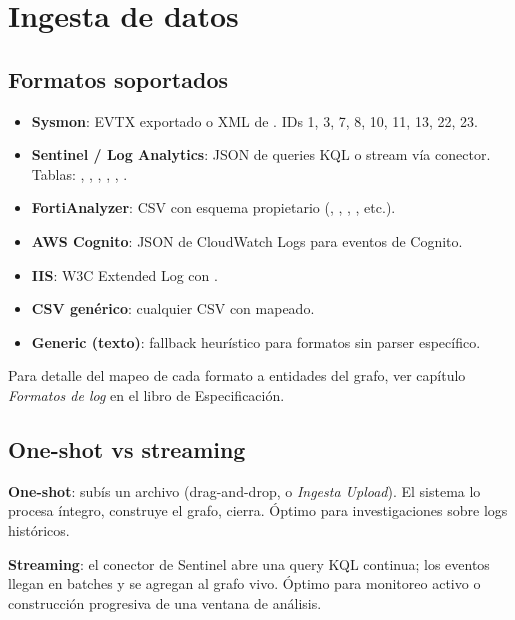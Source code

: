 \chapter{Ingesta de datos}
\label{sec:man-ingesta}

\section{Formatos soportados}

\begin{itemize}
    \item \textbf{Sysmon}: EVTX exportado o XML de
    . IDs 1, 3, 7, 8,
    10, 11, 13, 22, 23.
    \item \textbf{Sentinel / Log Analytics}: JSON de queries KQL o
    stream vía conector. Tablas: ,
    , ,
    , ,
    .
    \item \textbf{FortiAnalyzer}: CSV con esquema propietario
    (, , , , etc.).
    \item \textbf{AWS Cognito}: JSON de CloudWatch Logs para
    eventos de Cognito.
    \item \textbf{IIS}: W3C Extended Log con .
    \item \textbf{CSV genérico}: cualquier CSV con
     mapeado.
    \item \textbf{Generic (texto)}: fallback heurístico para
    formatos sin parser específico.
\end{itemize}

Para detalle del mapeo de cada formato a entidades del grafo, ver
capítulo \emph{Formatos de log} en el libro de Especificación.

\section{One-shot vs streaming}

\textbf{One-shot}: subís un archivo (drag-and-drop, o
\emph{Ingesta \textrightarrow{} Upload}). El sistema lo procesa
íntegro, construye el grafo, cierra. Óptimo para investigaciones
sobre logs históricos.

\textbf{Streaming}: el conector de Sentinel abre una query KQL
continua; los eventos llegan en batches y se agregan al grafo
vivo. Óptimo para monitoreo activo o construcción progresiva de
una ventana de análisis.

